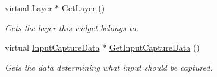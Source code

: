 \begin{DoxyCompactItemize}
virtual \hyperlink{classphys_1_1UI_1_1Layer}{Layer} $\ast$ \hyperlink{classphys_1_1UI_1_1Widget_a33f97d7da0ac48a35006cb71676e6c2e}{GetLayer} ()
\begin{DoxyCompactList}\small\item\em Gets the layer this widget belongs to. \item\end{DoxyCompactList}\item 
virtual \hyperlink{classphys_1_1UI_1_1InputCaptureData}{InputCaptureData} $\ast$ \hyperlink{classphys_1_1UI_1_1Widget_a900184fbe7af51581d6bddafb45d953a}{GetInputCaptureData} ()
\begin{DoxyCompactList}\small\item\em Gets the data determining what input should be captured. \item\end{DoxyCompactList}\end{DoxyCompactItemize}
